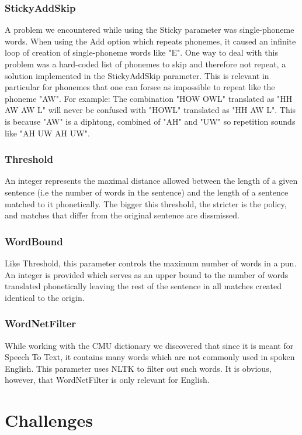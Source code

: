 \documentclass[11pt,a4paper]{article}
\begin{document}
\subsubsection{StickyAddSkip}
A problem we encountered while using the Sticky parameter was single-phoneme words. When using the Add option which repeats phonemes, it caused an infinite loop of creation of single-phoneme words like "E". One way to deal with this problem was a hard-coded list of phonemes to skip and therefore not repeat, a solution implemented in the StickyAddSkip parameter. This is relevant in particular for phonemes that one can forsee as impossible to repeat like the phoneme "AW". For example: The combination "HOW OWL" translated as "HH AW AW L" will never be confused with "HOWL" translated as "HH AW L". This is because "AW" is a diphtong, combined of "AH" and "UW" so repetition sounds like "AH UW AH UW".

\subsubsection{Threshold}
An integer represents the maximal distance allowed between the length of a given sentence (i.e the number of words in the sentence) and the length of a sentence matched to it phonetically. The bigger this threshold, the stricter is the policy, and matches that differ from the original sentence are dissmissed.

\subsubsection{WordBound}
Like Threshold, this parameter controls the maximum number of words in a pun. An integer is provided which serves as an upper bound to the number of words translated phonetically leaving the rest of the sentence in all matches created identical to the origin.

\subsubsection{WordNetFilter}
While working with the CMU dictionary we discovered that since it is meant for Speech To Text, it contains many words which are not commonly used in spoken English. This parameter uses NLTK to filter out such words. It is obvious, however, that WordNetFilter is only relevant for English.

\section{Challenges}
\end{document}
